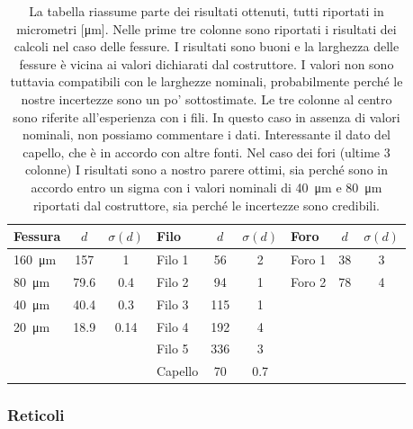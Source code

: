 \begin{table}[t!]
    \centering
    \begin{tabular}{l | c c || l | c c || l | c c }
        \toprule
        Fessura & $d$ & $\sigma(d)$ & Filo & $d$ & $\sigma(d)$ & Foro & $d$ & $\sigma(d)$ \\
        \midrule
        \SI{160}{\micro\metre} & 157  & 1    & Filo 1  & 56    &   2   & Foro 1 & 38 & 3 \\
        \SI{80}{\micro\metre}  & 79.6 & 0.4  & Filo 2  & 94    &   1   & Foro 2 & 78 & 4 \\
        \SI{40}{\micro\metre}  & 40.4 & 0.3  & Filo 3  & 115   &   1   &        &    &   \\
        \SI{20}{\micro\metre}  & 18.9 & 0.14 & Filo 4  & 192   &   4   &        &    &   \\
                               &      &      & Filo 5  & 336   &   3   &        &    &   \\
                               &      &      & Capello & 70    &   0.7 &        &    &   \\
        \bottomrule
    \end{tabular}
    \caption{La tabella riassume parte dei risultati ottenuti, tutti riportati in micrometri [\si{\micro\metre}].
    Nelle prime tre colonne sono riportati i risultati dei calcoli
    nel caso delle fessure. I risultati sono buoni e la larghezza delle fessure è vicina ai valori dichiarati dal costruttore.
    I valori non sono tuttavia compatibili con le larghezze nominali, probabilmente perché le nostre incertezze sono un po' sottostimate.
    Le tre colonne al centro sono riferite all'esperienza con i fili. In questo caso in assenza di valori nominali, non possiamo
    commentare i dati. Interessante il dato del capello, che è in accordo con altre fonti. Nel caso dei fori (ultime 3 colonne)
    I risultati sono a nostro parere ottimi, sia perché sono in accordo entro un sigma con i valori nominali di \SI{40}{\micro\metre} e
    \SI{80}{\micro\metre} riportati dal costruttore, sia perché le incertezze sono credibili.}
    \label{tab:ost}
\end{table}

\subsubsection{Reticoli}

